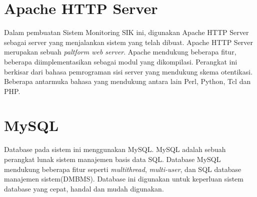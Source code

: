 \section{Apache HTTP Server}
\tab Dalam pembuatan Sistem Monitoring SIK ini, digunakan Apache HTTP Server sebagai server yang menjalankan sistem yang telah dibuat. Apache HTTP Server merupakan sebuah \textit{paltform web server}. Apache mendukung beberapa fitur, beberapa diimplementasikan sebagai modul yang dikompilasi. Perangkat ini berkisar dari bahasa pemrograman sisi server yang mendukung skema otentikasi. Beberapa antarmuka bahasa yang mendukung antara lain Perl, Python, Tcl dan PHP\cite{apache}.

\section{MySQL }
\tab Database pada sistem ini menggunakan MySQL. MySQL adalah sebuah perangkat lunak sistem manajemen basis data SQL. Database MySQL mendukung beberapa fitur seperti \textit{multithread}, \textit{multi-user}, dan SQL database manajemen sistem(DMBMS). Database ini digunakan untuk keperluan sistem database yang cepat, handal dan mudah digunakan\cite{mysql}.